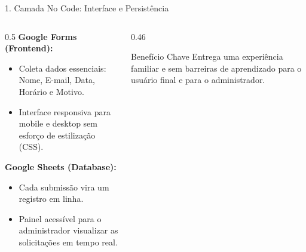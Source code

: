 \documentclass[aspectratio=169, 10pt]{beamer}
\begin{document}
\begin{frame}{1. Camada No Code: Interface e Persistência}
    \begin{columns}[T]
        \begin{column}{0.5\textwidth}
            \textbf{Google Forms (Frontend):}
            \begin{itemize}
                \item Coleta dados essenciais: Nome, E-mail, Data, Horário e Motivo.
                \item Interface responsiva para mobile e desktop sem esforço de estilização (CSS).
            \end{itemize}
            \vspace{0.2cm}
            \textbf{Google Sheets (Database):}
            \begin{itemize}
                \item Cada submissão vira um registro em linha.
                \item Painel acessível para o administrador visualizar as solicitações em tempo real.
            \end{itemize}
        \end{column}
        
        \begin{column}{0.46\textwidth}
            \begin{block}{Benefício Chave}
                Entrega uma experiência familiar e sem barreiras de aprendizado para o usuário final e para o administrador.
            \end{block}
        \end{column}
    \end{columns}
\end{frame}
\end{document}
